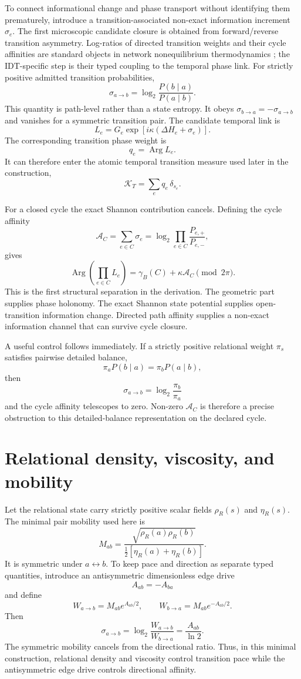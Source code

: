 To connect informational change and phase transport without identifying them prematurely, introduce a transition-associated non-exact information increment $\sigma_e$. The first microscopic candidate closure is obtained from forward/reverse transition asymmetry. Log-ratios of directed transition weights and their cycle affinities are standard objects in network nonequilibrium thermodynamics \cite{Schnakenberg1976}; the IDT-specific step is their typed coupling to the temporal phase link. For strictly positive admitted transition probabilities,
\[
\boxed{
\sigma_{a\to b}
=
\log_2\frac{P(b\mid a)}{P(a\mid b)}.
}
\]
This quantity is path-level rather than a state entropy. It obeys $\sigma_{b\to a}=-\sigma_{a\to b}$ and vanishes for a symmetric transition pair. The candidate temporal link is
\[
\boxed{
L_e
=
G_e\exp\!\left[i\kappa\left(\Delta H_e+\sigma_e\right)\right].
}
\]
The corresponding transition phase weight is
\[
q_e=\operatorname{Arg}L_e.
\]
It can therefore enter the atomic temporal transition measure used later in the construction,
\[
\mathcal K_T=\sum_e q_e\,\delta_{s_e}.
\]

For a closed cycle the exact Shannon contribution cancels. Defining the cycle affinity
\[
\mathcal A_C
=
\sum_{e\in C}\sigma_e
=
\log_2\prod_{e\in C}
\frac{P_{e,+}}{P_{e,-}},
\]
gives
\[
\boxed{
\operatorname{Arg}\!\left(\prod_{e\in C}L_e\right)
=
\gamma_B(C)
+
\kappa\mathcal A_C
\pmod{2\pi}.
}
\]
This is the first structural separation in the derivation. The geometric part supplies phase holonomy. The exact Shannon state potential supplies open-transition information change. Directed path affinity supplies a non-exact information channel that can survive cycle closure.

A useful control follows immediately. If a strictly positive relational weight $\pi_s$ satisfies pairwise detailed balance,
\[
\pi_aP(b\mid a)=\pi_bP(a\mid b),
\]
then
\[
\sigma_{a\to b}=\log_2\frac{\pi_b}{\pi_a}
\]
and the cycle affinity telescopes to zero. Non-zero $\mathcal A_C$ is therefore a precise obstruction to this detailed-balance representation on the declared cycle.

\section{Relational density, viscosity, and mobility}

Let the relational state carry strictly positive scalar fields $\rho_R(s)$ and $\eta_R(s)$. The minimal pair mobility used here is
\[
\boxed{
M_{ab}
=
\frac{\sqrt{\rho_R(a)\rho_R(b)}}
{\tfrac12[\eta_R(a)+\eta_R(b)]}.
}
\]
It is symmetric under $a\leftrightarrow b$. To keep pace and direction as separate typed quantities, introduce an antisymmetric dimensionless edge drive
\[
A_{ab}=-A_{ba}
\]
and define
\[
\boxed{
W_{a\to b}=M_{ab}e^{A_{ab}/2},
\qquad
W_{b\to a}=M_{ab}e^{-A_{ab}/2}.
}
\]
Then
\[
\sigma_{a\to b}
=
\log_2\frac{W_{a\to b}}{W_{b\to a}}
=
\frac{A_{ab}}{\ln2}.
\]
The symmetric mobility cancels from the directional ratio. Thus, in this minimal construction, relational density and viscosity control transition pace while the antisymmetric edge drive controls directional affinity.

